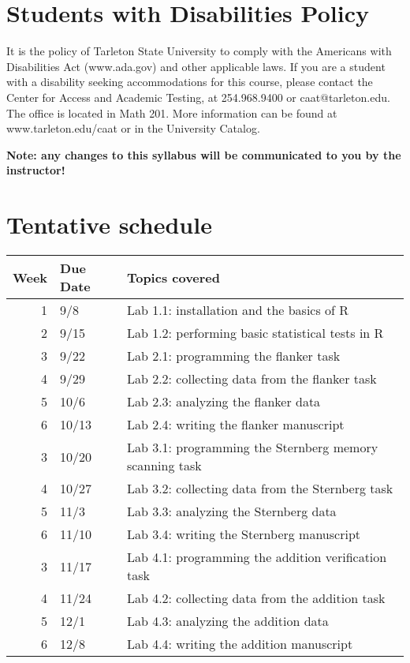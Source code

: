 \documentclass[10pt]{article}
\begin{document}
\section*{Students with Disabilities Policy}
\label{sec:orgc651d0e}

It is the policy of Tarleton State University to comply with the Americans with Disabilities  Act (www.ada.gov) and other applicable laws.  If you are a student with a disability seeking accommodations for this course, please contact the Center for Access and Academic Testing, at 254.968.9400 or caat@tarleton.edu. The office is located in Math 201. More information can be found at www.tarleton.edu/caat or in the University Catalog.​

\textbf{Note:  any changes to this syllabus will be communicated to you by the instructor!}

\section*{Tentative schedule}
\label{sec:orge73820c}

\begin{center}
\begin{tabular}{rll}
Week & Due Date & Topics covered\\
\hline
1 & 9/8 & Lab 1.1: installation and the basics of R\\
2 & 9/15 & Lab 1.2: performing basic statistical tests in R\\
3 & 9/22 & Lab 2.1: programming the flanker task\\
4 & 9/29 & Lab 2.2: collecting data from the flanker task\\
5 & 10/6 & Lab 2.3: analyzing the flanker data\\
6 & 10/13 & Lab 2.4: writing the flanker manuscript\\
3 & 10/20 & Lab 3.1: programming the Sternberg memory scanning task\\
4 & 10/27 & Lab 3.2: collecting data from the Sternberg task\\
5 & 11/3 & Lab 3.3: analyzing the Sternberg data\\
6 & 11/10 & Lab 3.4: writing the Sternberg manuscript\\
3 & 11/17 & Lab 4.1: programming the addition verification task\\
4 & 11/24 & Lab 4.2: collecting data from the addition task\\
5 & 12/1 & Lab 4.3: analyzing the addition data\\
6 & 12/8 & Lab 4.4: writing the addition manuscript\\
\end{tabular}
\end{center}
\end{document}
